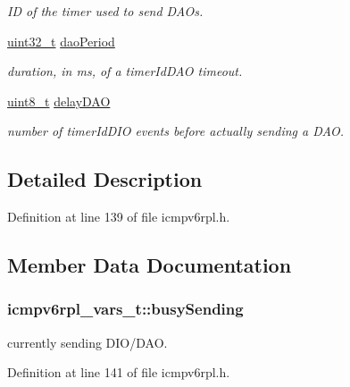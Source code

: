 \begin{DoxyCompactItemize}
\begin{DoxyCompactList}\small\item\em ID of the timer used to send D\+A\+Os. \end{DoxyCompactList}\item 
\hyperlink{_p_e___types_8h_a33594304e786b158f3fb30289278f5af}{uint32\+\_\+t} \hyperlink{structicmpv6rpl__vars__t_a91b6d595a19065508d23ef188daf47f3}{dao\+Period}
\begin{DoxyCompactList}\small\item\em duration, in ms, of a timer\+Id\+D\+AO timeout. \end{DoxyCompactList}\item 
\hyperlink{_p_e___types_8h_aba7bc1797add20fe3efdf37ced1182c5}{uint8\+\_\+t} \hyperlink{structicmpv6rpl__vars__t_af7f9f1a6d63edad786ec52a23a1c13e3}{delay\+D\+AO}
\begin{DoxyCompactList}\small\item\em number of timer\+Id\+D\+IO events before actually sending a D\+AO. \end{DoxyCompactList}\end{DoxyCompactItemize}


\subsection{Detailed Description}


Definition at line 139 of file icmpv6rpl.\+h.



\subsection{Member Data Documentation}
\subsubsection[{\texorpdfstring{busy\+Sending}{busySending}}]{ icmpv6rpl\+\_\+vars\+\_\+t\+::busy\+Sending}\hypertarget{structicmpv6rpl__vars__t_a42b926acc9b45cdbde4dfa18014facd5}{}\label{structicmpv6rpl__vars__t_a42b926acc9b45cdbde4dfa18014facd5}


currently sending D\+I\+O/\+D\+AO. 



Definition at line 141 of file icmpv6rpl.\+h.

